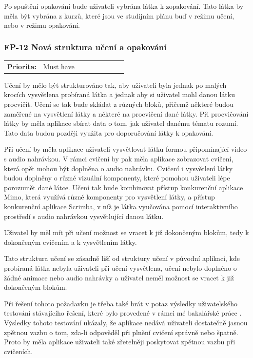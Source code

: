 Po spuštění opakování bude uživateli vybrána látka k zopakování. Tato látka by měla být vybrána z kurzů, které jsou ve studijním plánu buď v režimu učení, nebo v režimu opakování.

\subsubsection{FP-12 Nová struktura učení a opakování}\label{sec:fp-learning-structure}

\begin{tabular}{lp{0.7\linewidth}}
    \textbf{Priorita:} & Must have \\
\end{tabular}


Učení by mělo být strukturováno tak, aby uživateli byla jednak po malých krocích vysvětlena probíraná látka a jednak aby si uživatel mohl danou látku procvičit. Učení se tak bude skládat z různých bloků, přičemž některé budou zaměřené na vysvětlení látky a některé na procvičení dané látky. Při procvičování látky by měla aplikace sbírat data o tom, jak uživatel danému tématu rozumí. Tato data budou později využita pro doporučování látky k opakování.

Při učení by měla aplikace uživateli vysvětlovat látku formou připomínající video s audio nahrávkou. V rámci cvičení by pak měla aplikace zobrazovat cvičení, která opět mohou být doplněna o audio nahrávku. Cvičení i vysvětlení látky budou doplněny o různé vizuální komponenty, které pomohou uživateli lépe porozumět dané látce. Učení tak bude kombinovat přístup konkurenční aplikace Mimo, která využívá různé komponenty pro vysvětlení látky, a přístup konkurenční aplikace Scrimba, v níž je látka vyučována pomocí interaktivního prostředí s audio nahrávkou vysvětlující danou látku.

Uživatel by měl mít při učení možnost se vracet k již dokončeným blokům, tedy k dokončeným cvičením a k vysvětlením látky.

Tato struktura učení se zásadně liší od struktury učení v původní aplikaci, kde probíraná látka nebyla uživateli při učení vysvětlena, učení nebylo doplněno o žádné animace nebo audio nahrávky a uživatel neměl možnost se vracet k již dokončeným blokům.

Při řešení tohoto požadavku je třeba také brát v potaz výsledky uživatelského testování stávajícího řešení, které bylo provedené v rámci mé bakalářské práce \cite{Jenicek2024BachelorThesis}. Výsledky tohoto testování ukázaly, že aplikace nedává uživateli dostatečně jasnou zpětnou vazbu o tom, zda-li odpověděl při plnění cvičení správně nebo špatně. Proto by měla aplikace uživateli také zřetelněji poskytovat zpětnou vazbu při cvičeních.

